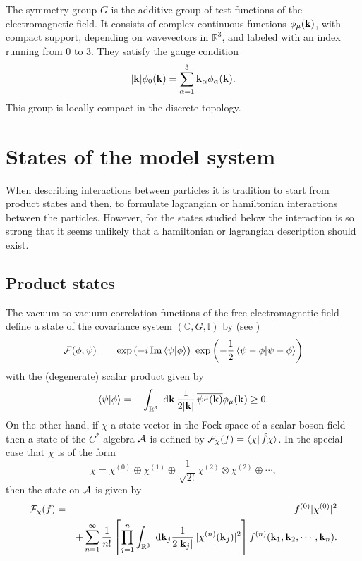 \documentclass[12pt,a4paper]{article}
\def\Ro{{\mathbb R}}
\def\Co{{\mathbb C}}
\def\Io{{\mathbb I}}
\def\kk{{\bf k}}
\renewcommand{\Im}{\,{\rm Im}\,}
\begin{document}
The symmetry group $G$ is the additive group of test functions
of the electromagnetic field.
It consists of complex continuous functions $\phi_\mu(\kk)$, with
compact support, depending on wavevectors in $\Ro^3$, and labeled with an
index running from 0 to 3. They satisfy the gauge condition
\begin{equation}
|\kk|\phi_0(\kk)=\sum_{\alpha=1}^3\kk_\alpha\phi_\alpha(\kk).
\label{psigauge}
\end{equation}
This group is locally compact in the discrete topology.


\section{States of the model system}

When describing interactions between particles it is
tradition to start from product states and then, to formulate
lagrangian or hamiltonian interactions between the particles.
However, for the states studied below the interaction is
so strong that it seems unlikely that a hamiltonian or
lagrangian description should exist.

\subsection{Product states}

The vacuum-to-vacuum correlation functions of
the free electromagnetic field define a state of the
covariance system $(\Co,G,\Io)$ by (see \cite {NK02})
\begin{eqnarray}
{\cal F}(\phi;\psi)&=&
\exp\left(-i\Im\langle \psi|\phi\rangle
\right)\
\exp\left(-\frac{1}{2}\,\langle \psi-\phi|
\psi-\phi\rangle\right)
\label{corphot}
\end{eqnarray}
with the (degenerate) scalar product given by
\begin{equation}
\langle \psi|\phi\rangle =-\int_{\Ro^3}\hbox{ d}\kk\,
\frac{1}{2|\kk|}\, \overline {\psi^\mu(\kk)}
\phi_\mu(\kk)\ge 0.
\label{bilin}
\end{equation}
On the other hand, if $\chi$ a state vector in the Fock space
of a scalar boson field then a state of the $C^*$-algebra $\cal A$ is defined
by ${\cal F}_\chi(f)=\langle\chi|\,\hat f\chi\rangle$.
In the special case that $\chi$ is of the form
\begin{equation}
\chi=\chi^{(0)}\oplus\chi^{(1)}
\oplus\frac{1}{\sqrt{2!}}\chi^{(2)}\otimes\chi^{(2)}
\oplus\cdots,
\label{classicstate}
\end{equation}
then the state on $\cal A$ is given by
\begin{eqnarray}
{\cal F}_\chi(f)
&=&f^{(0)}|\chi^{(0)}|^2\cr
& &
+\sum_{n=1}^\infty\frac{1}{n!}\left[\prod_{j=1}^n\int_{\Ro^3}\hbox{ d}\kk_j
\frac{1}{2|\kk_j|}\,|\chi^{(n)}(\kk_j)|^2\right]
 f^{(n)}(\kk_1,\kk_2,\cdots,\kk_n).\cr
& &
\label{corfluct}
\end{eqnarray}
\end{document}
